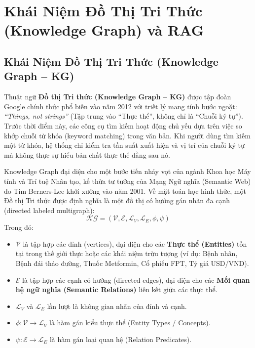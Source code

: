 \documentclass[12pt,a4paper]{report}
\begin{document}
\section{Khái Niệm Đồ Thị Tri Thức (Knowledge Graph) và RAG}

\subsection{Khái Niệm Đồ Thị Tri Thức (Knowledge Graph -- KG)}
Thuật ngữ \textbf{Đồ thị Tri thức (Knowledge Graph -- KG)} được tập đoàn Google chính thức phổ biến vào năm 2012 với triết lý mang tính bước ngoặt: \textit{“Things, not strings”} (Tập trung vào “Thực thể”, không chỉ là “Chuỗi ký tự”). Trước thời điểm này, các công cụ tìm kiếm hoạt động chủ yếu dựa trên việc so khớp chuỗi từ khóa (keyword matching) trong văn bản. Khi người dùng tìm kiếm một từ khóa, hệ thống chỉ kiểm tra tần suất xuất hiện và vị trí của chuỗi ký tự mà không thực sự hiểu bản chất thực thể đằng sau nó.

Knowledge Graph đại diện cho một bước tiến nhảy vọt của ngành Khoa học Máy tính và Trí tuệ Nhân tạo, kế thừa tư tưởng của Mạng Ngữ nghĩa (Semantic Web) do Tim Berners-Lee khởi xướng vào năm 2001. Về mặt toán học hình thức, một Đồ thị Tri thức được định nghĩa là một đồ thị có hướng gán nhãn đa cạnh (directed labeled multigraph):
\begin{equation}
    \mathcal{KG} = (\mathcal{V}, \mathcal{E}, \mathcal{L}_V, \mathcal{L}_E, \phi, \psi)
\end{equation}
Trong đó:
\begin{itemize}
    \item $\mathcal{V}$ là tập hợp các đỉnh (vertices), đại diện cho các \textbf{Thực thể (Entities)} tồn tại trong thế giới thực hoặc các khái niệm trừu tượng (ví dụ: Bệnh nhân, Bệnh đái tháo đường, Thuốc Metformin, Cổ phiếu FPT, Tỷ giá USD/VND).
    \item $\mathcal{E}$ là tập hợp các cạnh có hướng (directed edges), đại diện cho các \textbf{Mối quan hệ ngữ nghĩa (Semantic Relations)} liên kết giữa các thực thể.
    \item $\mathcal{L}_V$ và $\mathcal{L}_E$ lần lượt là không gian nhãn của đỉnh và cạnh.
    \item $\phi: \mathcal{V} \to \mathcal{L}_V$ là hàm gán kiểu thực thể (Entity Types / Concepts).
    \item $\psi: \mathcal{E} \to \mathcal{L}_E$ là hàm gán loại quan hệ (Relation Predicates).
\end{itemize}
\end{document}
